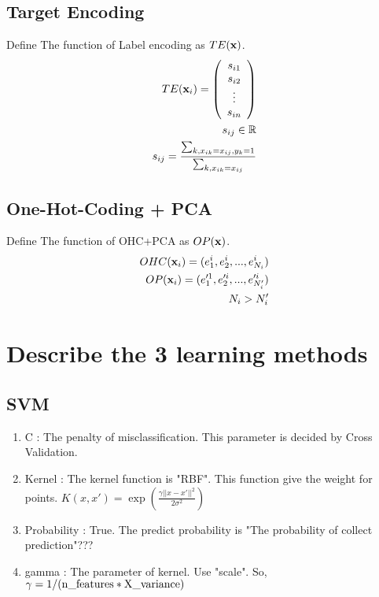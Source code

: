 \documentclass[twocolumn,9pt,a4j]{jarticle}
\begin{document}
	\subsection{Target Encoding}
		Define The function of Label encoding as $TE({\bf x})$.
		\begin{eqnarray}
			TE({\bf x}_i) = \left(
				\begin{array}{c}
					s_{i1}\\
					s_{i2}\\
					\vdots\\
					s_{in}
				\end{array}
			\right)\\
			s_{ij} \in \mathbb{R}\\
			s_{ij} = \frac{\sum_{k, x_{ik} = x_{ij} , y_k = 1}}{\sum_{k, x_{ik} = x_{ij} }}
		\end{eqnarray}
	\subsection{One-Hot-Coding + PCA}
		Define The function of OHC+PCA as $OP({\bf x})$.
		\begin{eqnarray}
			OHC({\bf x}_i) = (e_1^i, e_2^i, ... , e_{N_i}^i)\\
			OP({\bf x}_i) = (e_1'^1, e_2'^i, ... , e_{N_i'}'^i)\\
			N_i > N_i'
		\end{eqnarray}
  \section{Describe the 3 learning methods}
  	\subsection{SVM}
		\begin{enumerate}
			\item C : The penalty of misclassification. This parameter is decided by Cross Validation.
			\item Kernel : The kernel function is "RBF". This function give the weight for points. $K(x,x')=\exp(\frac{\gamma ||x-x'||^2}{2\sigma^2})$
			\item Probability : True. The predict probability is "The probability of collect prediction"???
			\item gamma : The parameter of kernel. Use "scale". So, $\gamma = 1/({\rm n\_features * X\_variance})$
		\end{enumerate} 
\end{document}
